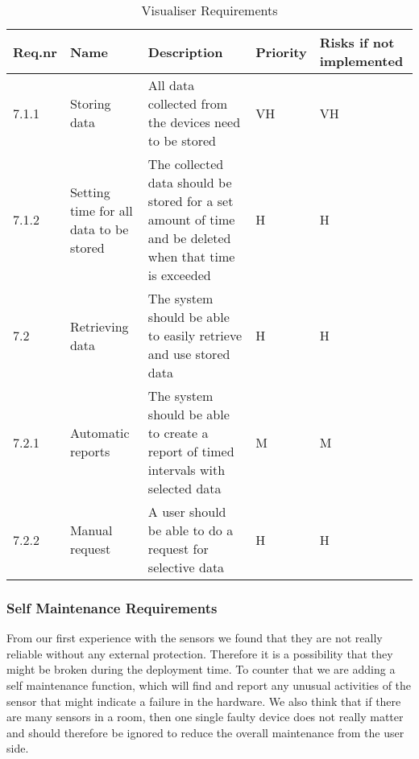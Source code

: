 \documentclass[../document]{subfiles}
\begin{document}
\begin{table}[H]
\caption{Visualiser Requirements}
\centering
\begin{tabularx}{\textwidth}{|l|X|X|l|X|}
	\hline
	Req.nr
	&Name
	&Description
	&Priority
	&Risks if not implemented
	\\ \hline 7.1.1
	&Storing data
	&All data collected from the devices need to be stored
	&VH
	&VH
	\\ \hline 7.1.2
	&Setting time for all data to be stored
	&The collected data should be stored for a set amount of time and be deleted when that time is exceeded
	&H
	&H
	\\ \hline 7.2
	&Retrieving data
	&The system should be able to easily retrieve and use stored data
	&H
	&H
	\\ \hline 7.2.1
	&Automatic reports
	&The system should be able to create a report of timed intervals with selected data
	&M
	&M
	\\ \hline 7.2.2
	&Manual request
	&A user should be able to do a request for selective data
	&H
	&H
	\\ \hline 
\end{tabularx}
\end{table}

\subsubsection{Self Maintenance Requirements}
From our first experience with the sensors we found that they are not really reliable without any external protection. Therefore it is a possibility that they might be broken during the deployment time. To counter that we are adding a self maintenance function, which will find and report any unusual activities of the sensor that might indicate a failure in the hardware. We also think that if there are many sensors in a room, then one single faulty device does not really matter and should therefore be ignored to reduce the overall maintenance from the user side.
\end{document}
